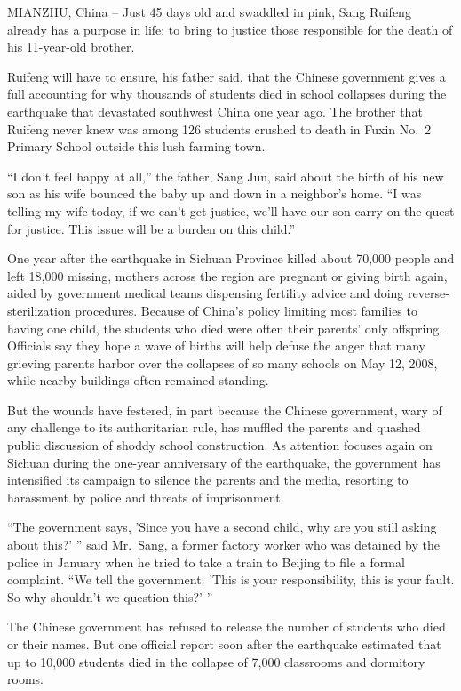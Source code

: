 \documentclass[12pt,a4paper,onecolumn]{article}
\begin{document}
MIANZHU, China -- Just 45 days old and swaddled in pink, Sang Ruifeng already has a purpose in life:
to bring to justice those responsible for the death of his 11-year-old brother.

Ruifeng will have to ensure, his father said, that the Chinese government gives a full accounting
for why thousands of students died in school collapses during the earthquake that devastated
southwest China one year ago. The brother that Ruifeng never knew was among 126 students crushed to
death in Fuxin No.~2 Primary School outside this lush farming town.

``I don't feel happy at all,'' the father, Sang Jun, said about the birth of his new son as his wife
bounced the baby up and down in a neighbor's home. ``I was telling my wife today, if we can't get
justice, we'll have our son carry on the quest for justice. This issue will be a burden on this
child.''

One year after the earthquake in Sichuan Province killed about 70,000 people and left 18,000
missing, mothers across the region are pregnant or giving birth again, aided by government medical
teams dispensing fertility advice and doing reverse-sterilization procedures. Because of China's
policy limiting most families to having one child, the students who died were often their parents'
only offspring. Officials say they hope a wave of births will help defuse the anger that many
grieving parents harbor over the collapses of so many schools on May 12, 2008, while nearby
buildings often remained standing.

But the wounds have festered, in part because the Chinese government, wary of any challenge to its
authoritarian rule, has muffled the parents and quashed public discussion of shoddy school
construction. As attention focuses again on Sichuan during the one-year anniversary of the
earthquake, the government has intensified its campaign to silence the parents and the media,
resorting to harassment by police and threats of imprisonment.

``The government says, 'Since you have a second child, why are you still asking about this?' '' said
Mr.~Sang, a former factory worker who was detained by the police in January when he tried to take a
train to Beijing to file a formal complaint. ``We tell the government: 'This is your responsibility,
this is your fault. So why shouldn't we question this?' ''

The Chinese government has refused to release the number of students who died or their names. But
one official report soon after the earthquake estimated that up to 10,000 students died in the
collapse of 7,000 classrooms and dormitory rooms.
\end{document}
